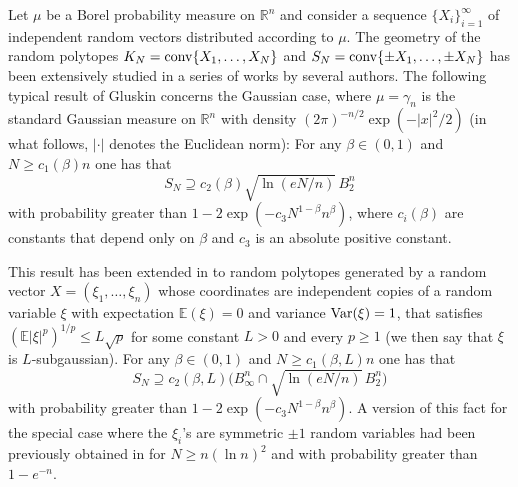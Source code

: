 \documentclass[11pt,leqno]{article}
\theoremstyle{definition}
\theoremstyle{remark}
\numberwithin{equation}{section}
\newcommand{\ls}{\leqslant}
\newcommand{\gr}{\geqslant}
\newcommand{\1}{\textbf{1}}
\begin{document}
Let $\mu$ be a Borel probability measure on $\mathbb{R}^n$ and consider a sequence
$\{X_i\}_{i=1}^{\infty}$ of independent
random vectors distributed according to $\mu$. The geometry of the random polytopes $K_N={\rm conv}\{X_1,\ldots ,X_N\}$
and $S_N={\rm conv}\{\pm X_1,\ldots ,\pm X_N\}$ has been extensively studied in a series of works
by several authors. The following typical result of
Gluskin \cite{Gluskin-1988} concerns the Gaussian case, where $\mu=\gamma_n$ is the standard Gaussian measure on
$\mathbb{R}^n$ with density $(2\pi)^{-n/2}\exp(-|x|^2/2)$ (in what follows, $|\cdot|$ denotes the
Euclidean norm): For any $\beta\in (0,1)$ and $N\gr c_1(\beta)n$ one has that
\begin{equation}\label{eq:gluskin}S_N\supseteq c_2(\beta)\sqrt{\ln (eN/n)}\,B_2^n\end{equation}
with probability greater than $1-2\exp(-c_3N^{1-\beta}n^{\beta})$, where $c_i(\beta)$ are constants that depend only on $\beta$
and $c_3$ is an absolute positive constant.

This result has been extended in \cite{Litvak-Pajor-Rudelson-Tomczak-2005} to random polytopes generated by a random vector $X=(\xi_1,\ldots ,\xi_n)$ whose
coordinates are independent copies of a random variable $\xi$ with expectation $\mathbb{E}(\xi)=0$ and variance
${\rm Var}(\xi)=1$, that satisfies $\left(\mathbb{E}|\xi|^p\right)^{1/p}\ls L\sqrt{p}$ for some constant $L>0$
and every $p\gr 1$ (we then say that $\xi$ is $L$-subgaussian). For any $\beta\in (0,1)$ and $N\gr c_1(\beta,L)n$ one has that
\begin{equation}\label{eq:rudelson-et-al}S_N\supseteq c_2(\beta,L)\Big(B_{\infty}^n\cap \sqrt{\ln (eN/n)}\,B_2^n\Big)\end{equation}
with probability greater than $1-2\exp(-c_3N^{1-\beta}n^{\beta})$. A version of this fact for the special case where
the $\xi_i$'s are symmetric $\pm 1$ random variables had been previously obtained in \cite{Giannopoulos-Hartzoulaki-2002} for $N\gr n(\ln n)^2$ and with probability greater than $1-e^{-n}$.
\end{document}
